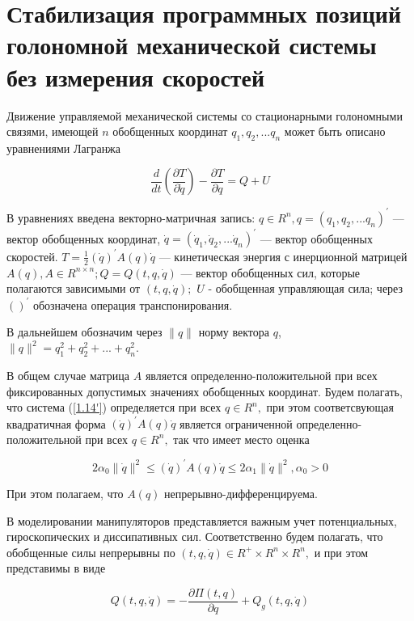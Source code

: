 \section{Стабилизация программных позиций голономной механической системы без измерения скоростей} \label{p12}

Движение управляемой механической системы со стационарными голономными связями, имеющей $n$ обобщенных координат $q_1, q_2, ... q_n$ может быть описано уравнениями Лагранжа 

\begin{equation} \label{1.14'}
\frac{d}{dt} (\frac{\partial T}{\partial \dot q}) - \frac{\partial T}{\partial q} = Q + U
\end{equation}

 В уравнениях введена векторно-матричная запись: $q \in R^n, q = (q_1, q_2, ... q_n)^{'}$ --- вектор обобщенных координат, $\dot q = (\dot q_1, \dot q_2, ... \dot q_n)^{'}$ --- вектор обобщенных скоростей. $T = \frac{1}{2} (\dot q)^{'} A(q) \dot q$ --- кинетическая энергия с инерционной матрицей $A(q), A \in R^{n \times n};  Q = Q(t, q, \dot q)$ --- вектор обобщенных сил, которые полагаются зависимыми от $(t, q, \dot q);$ $U$ - обобщенная управляющая сила; через $( )^{'}$ обозначена операция транспонирования. 

В дальнейшем обозначим через $\| q \|$ норму вектора $q$, $\|q\|^{2} = q_1^2 + q_2^2 + ... + q_n^2.$

В общем случае матрица $A$ является определенно-положительной при всех фиксированных допустимых значениях обобщенных координат. Будем полагать, что система (\ref{1.14'}) определяется при всех $q \in R^n,$ при этом соответсвующая квадратичная форма $(\dot q)^{'} A(q) \dot q$ является ограниченной определенно-положительной при всех $q \in R^n,$ так что имеет место оценка 

\begin{equation} \label{1.15'}
2 \alpha_0 \| \dot q \|^2 \le (\dot q)^{'} A(q) \dot q \le 2 \alpha_1 \| \dot q \|^2, \alpha_0 > 0
\end{equation}

При этом полагаем, что $A(q)$ непрерывно-дифференцируема.

В моделировании манипуляторов представляется важным учет потенциальных, гироскопических и диссипативных сил. Соответственно будем полагать, что обобщенные силы непрерывны по $(t, q, \dot q) \in R^{+} \times R^{n} \times R^{n},$ и при этом представимы в виде

\begin{equation} \label{1.16'}
Q(t, q, \dot q) = -\frac{\partial \Pi (t, q)}{\partial q} + Q_g (t, q, \dot q)
\end{equation}


